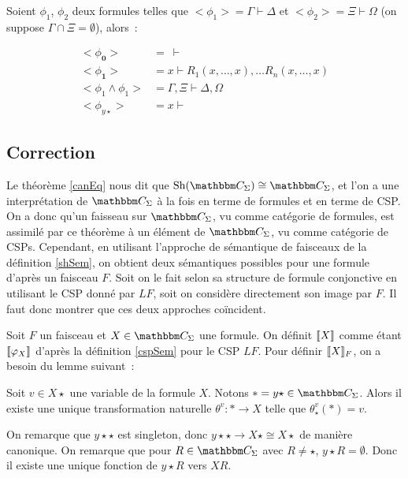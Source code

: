 \begin{lem}\label{seqStandarts}
    Soient $\phi_1$, $\phi_2$ deux formules telles que $<\phi_1> = \Gamma\vdash\Delta$ et
    $<\phi_2> = \Xi\vdash\Omega$ (on suppose $\Gamma\cap\Xi=\emptyset$), alors~:

    \begin{align*}
        <\phi_\mathbf{0}> &=~\vdash \\
        <\phi_\mathbf{1}> &= x\vdash R_1(x,\dots, x),\dots R_n(x, \dots, x) \\
        <\phi_1\wedge\phi_1> &= \Gamma,\Xi\vdash\Delta,\Omega \\
        <\phi_{y\star}> &= x\vdash
    \end{align*}
\end{lem}

\subsection{Correction}

Le théorème \ref{canEq} nous dit que $\sh(\C_\Sigma)\cong \C_\Sigma$, et l'on a
une interprétation de $\C_\Sigma$ à la fois en terme de formules et en terme de
CSP.  On a donc qu'un faisseau sur $\C_\Sigma$, vu comme catégorie de formules,
est assimilé par ce théorème à un élément de $\C_\Sigma$, vu comme catégorie de
CSPs.  Cependant, en utilisant l'approche de sémantique de faisceaux de la
définition \ref{shSem}, on obtient deux sémantiques possibles pour une formule
d'après un faisceau $F$.  Soit on le fait selon sa structure de formule
conjonctive en utilisant le CSP donné par $LF$, soit on considère directement
son image par $F$. Il faut donc montrer que ces deux approches coïncident.

Soit $F$ un faisceau et $X\in\C_\Sigma$ une formule. On définit $\llbracket {X} \rrbracket$ comme
étant $\llbracket {\varphi_X} \rrbracket$ d'après la définition \ref{cspSem} pour le CSP $LF$. Pour
définir $\llbracket {X} \rrbracket_F$, on a besoin du lemme suivant~:

\begin{lem}
    Soit $v\in X\star$ une variable de la formule $X$. Notons
    $\ast = y\star\in\C_\Sigma$. Alors il existe une unique transformation naturelle
    $\theta^v : \ast\rightarrow X$ telle que $\theta^v_\star(*) = v$.
\end{lem}

\begin{pv}
    On remarque que $y\star\star$ est singleton, donc
    $y\star\star\rightarrow X\star\cong X\star$ de manière canonique. On remarque que pour
    $R\in\C_\Sigma$ avec $R\neq\star$, $y\star R=\emptyset$. Donc il existe une unique
    fonction de $y\star R$ vers $X R$. 
\end{pv}

